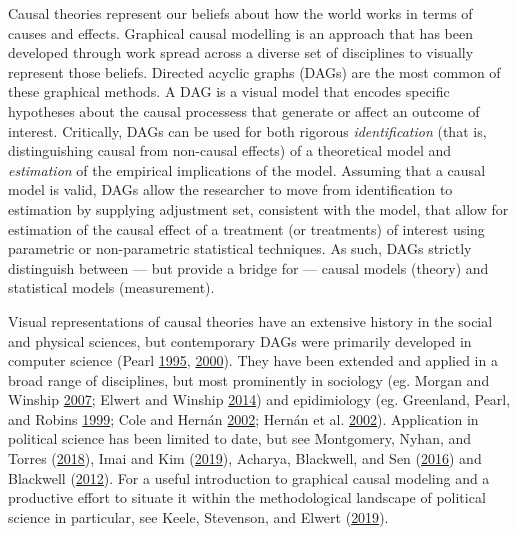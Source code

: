 \documentclass[11pt,]{book}
\begin{document}
Causal theories represent our beliefs about how the world works in terms of causes and effects. Graphical causal modelling is an approach that has been developed through work spread across a diverse set of disciplines to visually represent those beliefs. Directed acyclic graphs (DAGs) are the most common of these graphical methods. A DAG is a visual model that encodes specific hypotheses about the causal processess that generate or affect an outcome of interest. Critically, DAGs can be used for both rigorous \emph{identification} (that is, distinguishing causal from non-causal effects) of a theoretical model and \emph{estimation} of the empirical implications of the model. Assuming that a causal model is valid, DAGs allow the researcher to move from identification to estimation by supplying adjustment set, consistent with the model, that allow for estimation of the causal effect of a treatment (or treatments) of interest using parametric or non-parametric statistical techniques. As such, DAGs strictly distinguish between --- but provide a bridge for --- causal models (theory) and statistical models (measurement).

Visual representations of causal theories have an extensive history in the social and physical sciences, but contemporary DAGs were primarily developed in computer science (Pearl \protect\hyperlink{ref-pearl_causal_1995}{1995}, \protect\hyperlink{ref-pearl_causality_2000}{2000}). They have been extended and applied in a broad range of disciplines, but most prominently in sociology (eg. Morgan and Winship \protect\hyperlink{ref-morgan_counterfactuals_2007}{2007}; Elwert and Winship \protect\hyperlink{ref-elwert_endogenous_2014}{2014}) and epidimiology (eg. Greenland, Pearl, and Robins \protect\hyperlink{ref-greenland_causal_1999}{1999}; Cole and Hernán \protect\hyperlink{ref-cole_fallibility_2002}{2002}; Hernán et al. \protect\hyperlink{ref-hernan_causal_2002}{2002}). Application in political science has been limited to date, but see Montgomery, Nyhan, and Torres (\protect\hyperlink{ref-montgomery_how_2018}{2018}), Imai and Kim (\protect\hyperlink{ref-imai_when_2019}{2019}), Acharya, Blackwell, and Sen (\protect\hyperlink{ref-acharya_explaining_2016}{2016}) and Blackwell (\protect\hyperlink{ref-blackwell_framework_2012}{2012}). For a useful introduction to graphical causal modeling and a productive effort to situate it within the methodological landscape of political science in particular, see Keele, Stevenson, and Elwert (\protect\hyperlink{ref-keele_causal_2019}{2019}).
\end{document}
